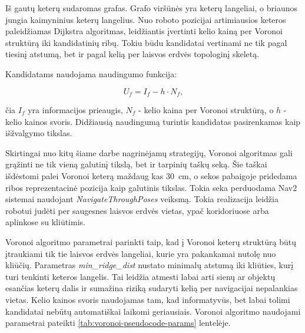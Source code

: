 \documentclass[]{VUMIFTemplateClass}
\begin{document}
Iš gautų keterų sudaromas grafas. Grafo viršūnės yra keterų langeliai, o briaunos jungia kaimyninius keterų langelius. Nuo roboto pozicijai artimiausios
keteros paleidžiamas Dijkstra algoritmas, leidžiantis įvertinti kelio kainą per Voronoi struktūrą iki kandidatinių ribų. Tokiu būdu kandidatai vertinami ne
tik pagal tiesinį atstumą, bet ir pagal kelią per laisvos erdvės topologinį skeletą.

Kandidatams naudojama naudingumo funkcija:

\begin{equation}
U_f = I_f - h \cdot N_f,
\end{equation}

čia $I_f$ yra informacijos prieaugis, $N_f$ - kelio kaina per Voronoi struktūrą, o $h$ - kelio kainos svoris. Didžiausią naudingumą turintis kandidatas
pasirenkamas kaip išžvalgymo tikslas.

Skirtingai nuo kitų šiame darbe nagrinėjamų strategijų, Voronoi algoritmas gali grąžinti ne tik vieną galutinį tikslą, bet ir tarpinių taškų seką. Šie taškai
išdėstomi palei Voronoi keterą maždaug kas 30~cm, o sekos pabaigoje pridedama ribos reprezentacinė pozicija kaip galutinis tikslas. Tokia seka perduodama Nav2 sistemai naudojant \textit{NavigateThroughPoses} veiksmą. Tokia realizacija leidžia robotui judėti per
saugesnes laisvos erdvės vietas, ypač koridoriuose arba aplinkose su kliūtimis.

Voronoi algoritmo parametrai parinkti taip, kad į Voronoi keterų struktūrą būtų įtraukiami tik tie laisvos erdvės langeliai, kurie yra pakankamai nutolę nuo
kliūčių. Parametras \textit{min\_ridge\_dist} nustato minimalų atstumą iki kliūties, kurį turi tenkinti keteros langelis. Tai leidžia atmesti labai arti sienų
ar objektų esančias keterų dalis ir sumažina riziką sudaryti kelią per navigacijai nepalankias vietas. Kelio kainos svoris naudojamas tam, kad informatyvūs,
bet labai tolimi kandidatai nebūtų automatiškai laikomi geriausiais. Voronoi algoritmo naudojami parametrai pateikti \ref{tab:voronoi-pseudocode-params}
lentelėje.
\end{document}

